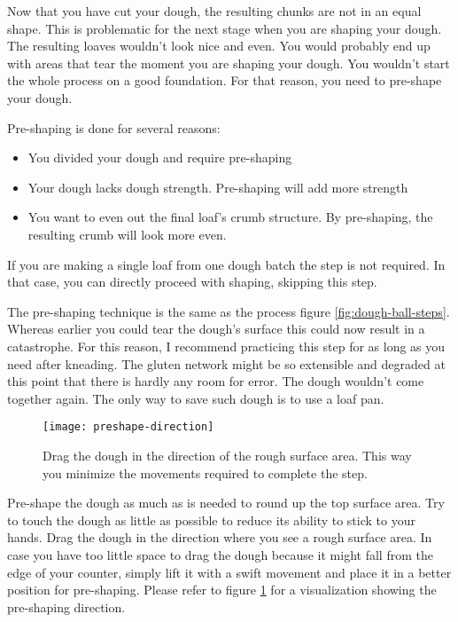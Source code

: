 Now that you have cut your dough, the resulting chunks are not in an equal shape.
This is problematic for the next stage when you are shaping your dough.
The resulting loaves wouldn't look nice and even. You would probably
end up with areas that tear the moment you are shaping your dough.
You wouldn't start the whole process on a good foundation. For that
reason, you need to pre-shape your dough.

Pre-shaping is done for several reasons:
\begin{itemize}
  \item You divided your dough and require pre-shaping
  \item Your dough lacks dough strength. Pre-shaping will add more strength
  \item You want to even out the final loaf's crumb structure. By pre-shaping,
  the resulting crumb will look more even.
\end{itemize}

If you are making a single loaf from one dough batch the step is not required.
In that case, you can directly proceed with shaping, skipping this step.
  
The pre-shaping technique is the same as the process figure \ref{fig:dough-ball-steps}.
Whereas earlier you could tear the dough's surface this could now result in a catastrophe.
For this reason, I recommend practicing this step for as long as you need after kneading.
The gluten network might be so extensible and degraded at this point that there
is hardly any room for error. The dough wouldn't come together again. The only
way to save such dough is to use a loaf pan.

\begin{figure}[!htb]
  \texttt{[image: preshape-direction]}
  \caption{Drag the dough in the direction of the rough surface area. This
  way you minimize the movements required to complete the step.}
  \label{fig:preshape-direction}
\end{figure}

Pre-shape the dough as much as is needed to round up the top
surface area. Try to touch the dough as little as possible
to reduce its ability to stick to your hands. Drag the dough
in the direction where you see a rough surface area. In
case you have too little space to drag the dough because it might
fall from the edge of your counter, simply lift it with a swift movement and place
it in a better position for pre-shaping. Please refer to figure \ref{fig:preshape-direction}
for a visualization showing the pre-shaping direction.

